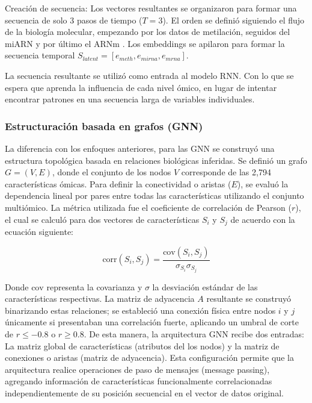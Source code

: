 \documentclass[preprint,number]{elsarticle}
\begin{document}
Creación de secuencia: Los vectores resultantes se organizaron para formar una secuencia de solo 3 pasos de tiempo ($T=3$). El orden se definió siguiendo el flujo de la biología molecular, empezando por los datos de metilación, seguidos del miARN y por último el ARNm \cite{jeon2025investigating,fabbri2010epigenetics}. Los embeddings se apilaron para formar la secuencia temporal $S_{latent} = [e_{meth}, e_{mirna}, e_{mrna}]$.

La secuencia resultante se utilizó como entrada al modelo RNN. Con lo que se espera que aprenda la influencia de cada nivel ómico, en lugar de intentar encontrar patrones en una secuencia larga de variables individuales.

\subsubsection{Estructuración basada en grafos (GNN)}

La diferencia con los enfoques anteriores, para las GNN se construyó una estructura topológica basada en relaciones biológicas inferidas. Se definió un grafo $G = (V, E)$, donde el conjunto de los nodos $V$ corresponde de las 2,794 características ómicas. Para definir la conectividad o aristas ($E$), se evaluó la dependencia lineal por pares entre todas las características utilizando el conjunto multiómico. La métrica utilizada fue el coeficiente de correlación de Pearson ($r$), el cual se calculó para dos vectores de características $S_i$ y $S_j$ de acuerdo con la ecuación siguiente:

\begin{equation}
    \text{corr}(S_i, S_j) = \frac{\text{cov}(S_i, S_j)}{\sigma_{S_i} \sigma_{S_j}}
\end{equation}

Donde $\text{cov}$ representa la covarianza y $\sigma$ la desviación estándar de las características respectivas. La matriz de adyacencia $A$ resultante se construyó binarizando estas relaciones; se estableció una conexión física entre nodos $i$ y $j$ únicamente si presentaban una correlación fuerte, aplicando un umbral de corte de $r \le -0.8$ o $r \ge 0.8$. De esta manera, la arquitectura GNN recibe dos entradas: La matriz global de características (atributos del los nodos) y la matriz de conexiones o aristas (matriz de adyacencia). Esta configuración permite que la arquitectura realice operaciones de paso de mensajes (message passing), agregando información de características funcionalmente correlacionadas independientemente de su posición secuencial en el vector de datos original.
\end{document}
